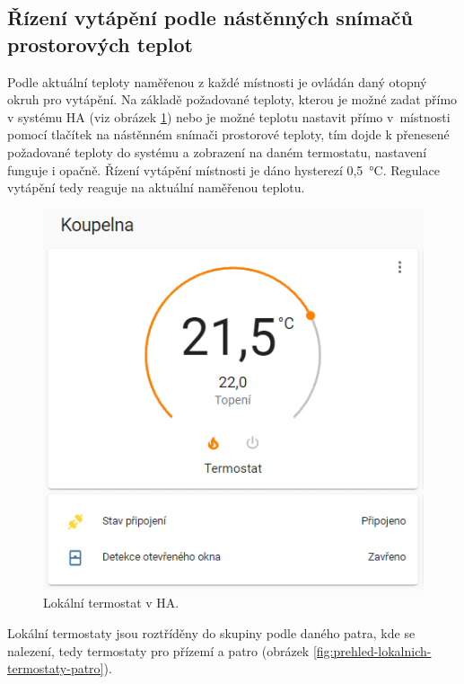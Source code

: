 \subsection{Řízení vytápění podle nástěnných snímačů prostorových teplot}
\label{sec:rizeni-vytapeni-podle-nastennych-snimacu-prostorovych-teplot}
Podle aktuální teploty naměřenou z každé místnosti je ovládán daný otopný okruh pro vytápění. Na základě požadované teploty, kterou je možné zadat přímo v systému HA (viz obrázek \ref{fig:lokalni-termostat-ha}) nebo je možné teplotu nastavit přímo v~místnosti pomocí tlačítek na nástěnném snímači prostorové teploty, tím dojde k přenesené požadované teploty do systému a zobrazení na daném termostatu, nastavení funguje i opačně. Řízení vytápění místnosti je dáno hysterezí 0,5~°C. Regulace vytápění tedy reaguje na aktuální naměřenou teplotu.

\begin{figure}[H]
    \centering
    \includegraphics[width=\textwidth]{images/software-ha/lokalni-termostat-ha.png}
    \caption{Lokální termostat v HA.}
    \label{fig:lokalni-termostat-ha}
\end{figure}

Lokální termostaty jsou roztříděny do skupiny podle daného patra, kde se nalezení, tedy termostaty pro přízemí a patro (obrázek \ref{fig:prehled-lokalnich-termostaty-patro}).

